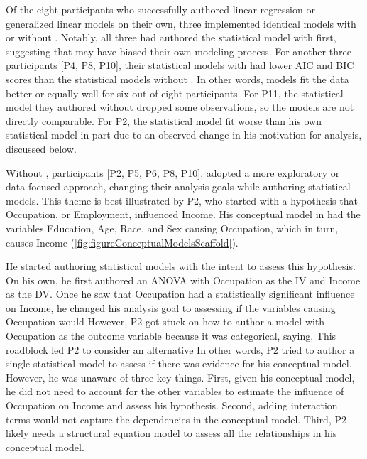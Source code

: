 Of the eight participants who successfully authored linear regression or
generalized linear models on their own, three implemented identical models with
or without \rTisane [P7, P9, P13]. Notably, all three had authored the
statistical model with \rTisane first, suggesting that \rTisane may have biased
their own modeling process. For another three participants [P4, P8, P10], their
statistical models with \rTisane had lower AIC and BIC scores than the
statistical models without \rTisane. In other words, \rTisane models fit the data
better or equally well for six out of eight participants. For P11, the
statistical model they authored without \rTisane dropped some observations, so
the models are not directly comparable. For P2, the \rTisane statistical model fit
worse than his own statistical model in part due to an observed change in his
motivation for analysis, discussed below. 

Without \rTisane, participants [P2, P5, P6, P8, P10], adopted a more exploratory
or data-focused approach, changing their analysis goals while authoring
statistical models. This theme is best illustrated by P2, who started with a
hypothesis that Occupation, or Employment, influenced Income. His conceptual
model in \rTisane had the variables Education, Age, Race, and Sex causing
Occupation, which in turn, causes Income (\autoref{fig:figureConceptualModelsScaffold}). 

He started authoring statistical models with the intent to assess this
hypothesis. On his own, he first authored an ANOVA with Occupation as the IV and
Income as the DV. Once he saw that Occupation had a statistically significant
influence on Income, he changed his analysis goal to assessing if the variables
causing Occupation would  However, P2 got stuck on how to author a model
with Occupation as the outcome variable because it was categorical, saying,
 This roadblock led P2 to consider an alternative
 In other words,
P2 tried to author a single statistical model to assess if there was evidence
for his conceptual model. However, he was unaware of three key things. First,
given his conceptual model, he did not need to account for the other variables
to estimate the influence of Occupation on Income and assess his hypothesis.
Second, adding interaction terms would not capture the dependencies in the
conceptual model. Third, P2 likely needs a structural equation model to assess all the relationships in his conceptual model.

